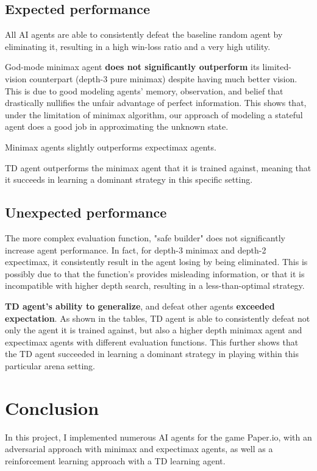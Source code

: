 \documentclass{article}
\begin{document}
\subsection{Expected performance}

All AI agents are able to consistently defeat the baseline random agent by eliminating it, resulting in a high win-loss ratio and a very high utility.

God-mode minimax agent \textbf{does not significantly outperform} its limited-vision counterpart (depth-3 pure minimax) despite having much better vision. This is due to good modeling agents' memory, observation, and belief that drastically nullifies the unfair advantage of perfect information. This shows that, under the limitation of minimax algorithm, our approach of modeling a stateful agent does a good job in approximating the unknown state.

Minimax agents slightly outperforms expectimax agents.

TD agent outperforms the minimax agent that it is trained against, meaning that it succeeds in learning a dominant strategy in this specific setting.

\subsection{Unexpected performance}

The more complex evaluation function, "safe builder" does not significantly increase agent performance. In fact, for depth-3 minimax and depth-2 expectimax, it consistently result in the agent losing by being eliminated. This is possibly due to that the function's provides misleading information, or that it is incompatible with higher depth search, resulting in a less-than-optimal strategy.

\textbf{TD agent's ability to generalize}, and defeat other agents \textbf{exceeded expectation}. As shown in the tables, TD agent is able to consistently defeat not only the agent it is trained against, but also a higher depth minimax agent and expectimax agents with different evaluation functions. This further shows that the TD agent succeeded in learning a dominant strategy in playing within this particular arena setting.


\section{Conclusion}

In this project, I implemented numerous AI agents for the game Paper.io, with an adversarial approach with minimax and expectimax agents, as well as a reinforcement learning approach with a TD learning agent.
\end{document}
